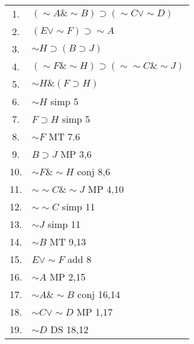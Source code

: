\begin{tabular}{cl}
    1. & $(\sim A\&\sim B)\supset(\sim C\vee \sim D)$\\
    2. & $(E\vee \sim F)\supset \sim A$\\
    3. & $\sim H\supset(B\supset J)$\\
    4. & $(\sim F\&\sim H)\supset(\sim\sim C\& \sim J)$\\
    5. & $\sim H\&(F\supset H)$\\
    \hline
    6. & $\sim H$ simp 5\\
    7. & $F\supset H$ simp 5\\
    8. & $\sim F$ MT 7.6\\
    9. & $B\supset J$ MP 3,6\\
    10. & $\sim F\&\sim H$ conj 8,6\\
    11. & $\sim\sim C\&\sim J$ MP 4,10\\
    12. & $\sim\sim C$ simp 11\\
    13. & $\sim J$ simp 11\\
    14. & $\sim B$ MT 9,13\\
    15. & $E\vee \sim F$ add 8\\
    16. & $\sim A$ MP 2,15\\
    17. & $\sim A\&\sim B$ conj 16,14\\
    18. & $\sim C\vee \sim D$ MP 1,17\\
    19. & $\sim D$ DS 18,12
\end{tabular}\\

